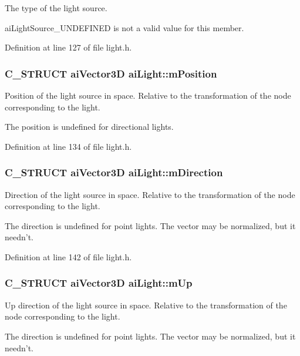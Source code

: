 The type of the light source.

aiLightSource\_\-UNDEFINED is not a valid value for this member. 

Definition at line 127 of file light.h.\hypertarget{structai_light_5daf9c9ad2613603b847a527123611f0}{
\subsubsection[mPosition]{\setlength{\rightskip}{0pt plus 5cm}C\_\-STRUCT aiVector3D {\bf aiLight::mPosition}}}
\label{structai_light_5daf9c9ad2613603b847a527123611f0}


Position of the light source in space. Relative to the transformation of the node corresponding to the light.

The position is undefined for directional lights. 

Definition at line 134 of file light.h.\hypertarget{structai_light_f3776d5e4e6065cb6dd7e10dc656dada}{
\subsubsection[mDirection]{\setlength{\rightskip}{0pt plus 5cm}C\_\-STRUCT aiVector3D {\bf aiLight::mDirection}}}
\label{structai_light_f3776d5e4e6065cb6dd7e10dc656dada}


Direction of the light source in space. Relative to the transformation of the node corresponding to the light.

The direction is undefined for point lights. The vector may be normalized, but it needn't. 

Definition at line 142 of file light.h.\hypertarget{structai_light_c6d03040085bf88979bc55e19ff3a7d6}{
\subsubsection[mUp]{\setlength{\rightskip}{0pt plus 5cm}C\_\-STRUCT aiVector3D {\bf aiLight::mUp}}}
\label{structai_light_c6d03040085bf88979bc55e19ff3a7d6}


Up direction of the light source in space. Relative to the transformation of the node corresponding to the light.

The direction is undefined for point lights. The vector may be normalized, but it needn't. 

